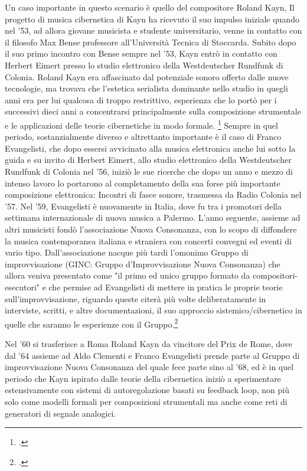 Un caso importante in questo scenario è quello del compositore Roland Kayn,
Il progetto di musica cibernetica di Kayn ha ricevuto il suo impulso iniziale
quando nel '53, ad allora giovane musicista e studente universitario,
venne in contatto con il filosofo Max Bense professore all'Università Tecnica di Stoccarda.
Subito dopo il suo primo incontro con Bense sempre nel '53, Kayn entrò in contatto con Herbert
Eimert presso lo studio elettronico della Westdeutscher Rundfunk di Colonia.
Roland Kayn era affascinato dal potenziale sonoro offerto dalle nuove tecnologie,
ma trovava che l'estetica serialista dominante nello studio in quegli anni
era per lui qualcosa di troppo restrittivo, esperienza che lo portò
per i successivi dieci anni a concentrarsi
principalmente sulla composizione strumentale e le applicazioni delle teorie
cibernetiche in modo formale. \footcite{thomaswpattesonkayn}
Sempre in quel periodo, sostanzialmente diverso e altrettanto importante
è il caso di Franco Evangelisti, che dopo essersi avvicinato alla musica elettronica
anche lui sotto la guida e su invito di Herbert Eimert, allo studio elettronico
della Westdeutscher Rundfunk di Colonia nel '56,
iniziò le sue ricerche che dopo un anno e mezzo di intenso lavoro lo portarono
al completamento della sua forse più importante composizione elettronica:
Incontri di fasce sonore, trasmessa da Radio Colonia nel '57.
Nel '59, Evangelisti è nuovamente in Italia, dove fu tra i promotori
della settimana internazionale di nuova musica a Palermo.
L'anno seguente, assieme ad altri musicisti
fondò l'associazione Nuova Consonanza, con lo scopo di diffondere
la musica contemporanea italiana e straniera con concerti convegni ed eventi di vario tipo.
Dall'associazione nacque più tardi l'omonimo Gruppo di improvvisazione 
(GINC: Gruppo d'Improvvisazione Nuova Consonanza)
che allora veniva presentato come "il primo ed unico gruppo formato da compositori-esecutori"
e che permise ad Evangelisti di mettere in pratica le proprie teorie sull'improvvisazione,
riguardo queste citerà più volte deliberatamente in interviste, scritti,
e altre documentazioni, il suo approccio sistemico/cibernetico
in quelle che saranno le esperienze con il Gruppo.\footcite{GINCAzioni} 

Nel '60 si trasferisce a Roma Roland Kayn da vincitore del Prix de Rome,
dove dal '64 assieme ad Aldo Clementi e Franco Evangelisti
prende parte al Gruppo di improvvisazione Nuova Consonanza
del quale fece parte sino al '68,
ed è in quel periodo che Kayn ispirato dalle teorie della cibernetica iniziò a sperimentare
estensivamente con sistemi di autoregolazione basati su feedback loop,
non più solo come modelli formali per composizioni strumentali
ma anche come reti di generatori di segnale analogici. 

